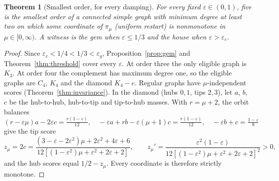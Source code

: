 \documentclass[11pt,a4paper]{article}
\newtheorem{theorem}{Theorem}[section]
\theoremstyle{definition}\newtheorem{conjecture}{Conjecture}
\theoremstyle{remark}\newtheorem{remark}[theorem]{Remark}
\newcommand{\eps}{\varepsilon}
\begin{document}
\begin{theorem}[Smallest order, for every damping]\label{thm:minimal}
For every fixed $\eps\in(0,1)$, five is the smallest order of a connected simple graph with minimum degree at least two on which some coordinate of $\pi_\mu$ (uniform restart) is nonmonotone in $\mu\in[0,\infty)$. A witness is the gem when $\eps\leq1/3$ and the house when $\eps>\eps_c$.
\end{theorem}
\begin{proof}
Since $\eps_c<1/4<1/3<\eps_g$, Proposition~\ref{prop:gem} and Theorem~\ref{thm:threshold} cover every $\eps$. At order three the only eligible graph is $K_3$. At order four the complement has maximum degree one, so the eligible graphs are $C_4$, $K_4$ and the diamond $K_4-e$. Regular graphs have $\mu$-independent scores (Theorem~\ref{thm:invariance}). In the diamond (hubs $0,1$, tips $2,3$), let $a$, $b$, $c$ be the hub-to-hub, hub-to-tip and tip-to-hub masses. With $r=\mu+2$, the orbit balances
\[
 (r-\eps\mu)a-2\eps c=\tfrac{r(1-\eps)}{12},\quad
 -\eps a+rb-\eps(\mu+1)c=\tfrac{r(1-\eps)}{12},\quad
 -\eps b+c=\tfrac{1-\eps}{8}
\]
give the tip score
\[
 z_\mu=2c=\frac{(3-\eps-2\eps^2)\mu+2\eps^2+4\eps+6}{12[(1-\eps^2)\mu+\eps^2+2\eps+2]},
 \qquad
 z_\mu'=\frac{\eps^2(1-\eps)}{12[(1-\eps^2)\mu+\eps^2+2\eps+2]^2}>0,
\]
and the hub scores equal $1/2-z_\mu$. Every coordinate is therefore strictly monotone.
\end{proof}
\end{document}
